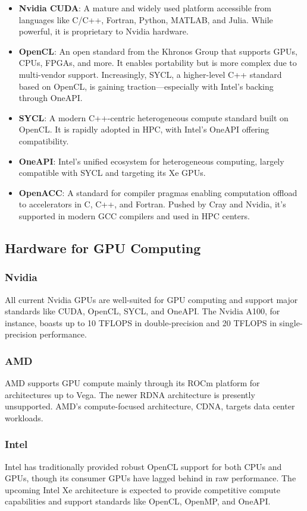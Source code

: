 \documentclass[11pt,a4paper]{book}
\begin{document}
\begin{itemize}
  \item \textbf{Nvidia CUDA}: A mature and widely used platform accessible from languages like C/C++, Fortran, Python, MATLAB, and Julia. While powerful, it is proprietary to Nvidia hardware.
  \item \textbf{OpenCL}: An open standard from the Khronos Group that supports GPUs, CPUs, FPGAs, and more. It enables portability but is more complex due to multi-vendor support. Increasingly, SYCL, a higher-level C++ standard based on OpenCL, is gaining traction—especially with Intel’s backing through OneAPI.
  \item \textbf{SYCL}: A modern C++-centric heterogeneous compute standard built on OpenCL. It is rapidly adopted in HPC, with Intel’s OneAPI offering compatibility.
  \item \textbf{OneAPI}: Intel’s unified ecosystem for heterogeneous computing, largely compatible with SYCL and targeting its Xe GPUs.
  \item \textbf{OpenACC}: A standard for compiler pragmas enabling computation offload to accelerators in C, C++, and Fortran. Pushed by Cray and Nvidia, it's supported in modern GCC compilers and used in HPC centers.
\end{itemize}

\subsection*{Hardware for GPU Computing}

\subsubsection*{Nvidia}
All current Nvidia GPUs are well-suited for GPU computing and support major standards like CUDA, OpenCL, SYCL, and OneAPI. The Nvidia A100, for instance, boasts up to 10 TFLOPS in double-precision and 20 TFLOPS in single-precision performance.

\subsubsection*{AMD}
AMD supports GPU compute mainly through its ROCm platform for architectures up to Vega. The newer RDNA architecture is presently unsupported. AMD’s compute-focused architecture, CDNA, targets data center workloads.

\subsubsection*{Intel}
Intel has traditionally provided robust OpenCL support for both CPUs and GPUs, though its consumer GPUs have lagged behind in raw performance. The upcoming Intel Xe architecture is expected to provide competitive compute capabilities and support standards like OpenCL, OpenMP, and OneAPI.
\end{document}
